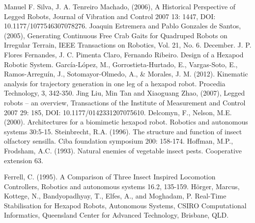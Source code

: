 \documentclass[conference]{IEEEtran}
\begin{document}
\begin{thebibliography}{00}   

    Manuel F. Silva, J. A. Tenreiro Machado, (2006), A Historical Perspective of Legged Robots, Journal of Vibration and Control 2007 13: 1447,
    DOI: 10.1177/1077546307078276.
    Joaquin Estremera and Pablo Gonzales de Santos, (2005), Generating Continuous Free Crab Gaits for Quadruped Robots on Irregular Terrain, IEEE Transactions on Robotics, Vol. 21, No. 6. December.
    J. P. Flores Fernandes, J. C. Pimenta Claro, Fernando Ribeiro. Design of a Hexapod Robotic System.    
    García-López, M., Gorrostieta-Hurtado, E., Vargas-Soto, E., Ramos-Arreguín, J., Sotomayor-Olmedo, A., \& Morales, J. M. (2012). Kinematic analysis for trajectory generation in one leg of a hexapod robot. Procedia Technology, 3, 342-350.
    Jing Liu, Min Tan and Xiaoguang Zhao, (2007), Legged robots – an overview, Transactions of the Institute of Measurement and Control 2007 29: 185, DOI: 10.1177/0142331207075610.
     Delcomyn, F., Nelson, M.E. (2000). Architectures for a biomimetic hexapod robot. Robotics and autonomous systems 30:5-15.
    Steinbrecht, R.A. (1996). The structure and function of insect olfactory sensilla. Ciba foundation symposium 200: 158-174.
    Hoffman, M.P., Frodsham, A.C. (1993). Natural enemies of vegetable insect pests. Cooperative extension 63.
    
    Ferrell, C. (1995). A Comparison of Three Insect Inspired Locomotion Controllers, Robotics and autonomous systems 16.2, 135-159.
    Hörger, Marcus, Kottege, N., Bandyopadhyay, T., Elfes, A., and Moghadam, P. Real-Time Stabilisation for Hexapod Robots, Autonomous Systems, CSIRO Computational Informatics, Queensland Center for Advanced Technology, Brisbane, QLD.
\end{thebibliography}
\end{document}
